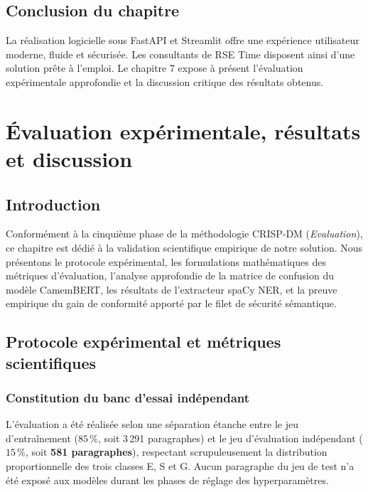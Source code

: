 \documentclass[12pt,a4paper]{report}
\begin{document}
\section{Conclusion du chapitre}
La réalisation logicielle sous FastAPI et Streamlit offre une expérience utilisateur moderne, fluide et sécurisée. Les consultants de RSE Time disposent ainsi d'une solution prête à l'emploi. Le chapitre 7 expose à présent l'évaluation expérimentale approfondie et la discussion critique des résultats obtenus.

\newpage

\chapter{Évaluation expérimentale, résultats et discussion}

\section{Introduction}
Conformément à la cinquième phase de la méthodologie CRISP-DM (\textit{Evaluation}), ce chapitre est dédié à la validation scientifique empirique de notre solution. Nous présentons le protocole expérimental, les formulations mathématiques des métriques d'évaluation, l'analyse approfondie de la matrice de confusion du modèle CamemBERT, les résultats de l'extracteur spaCy NER, et la preuve empirique du gain de conformité apporté par le filet de sécurité sémantique.

\section{Protocole expérimental et métriques scientifiques}

\subsection{Constitution du banc d'essai indépendant}
L'évaluation a été réalisée selon une séparation étanche entre le jeu d'entraînement ($85\,\%$, soit 3\,291 paragraphes) et le jeu d'évaluation indépendant ($15\,\%$, soit \textbf{581 paragraphes}), respectant scrupuleusement la distribution proportionnelle des trois classes E, S et G. Aucun paragraphe du jeu de test n'a été exposé aux modèles durant les phases de réglage des hyperparamètres.
\end{document}
